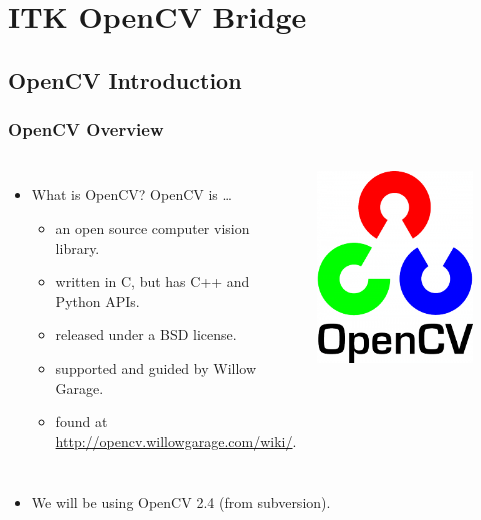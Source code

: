 \section{ITK OpenCV Bridge}

\subsection{OpenCV Introduction}





\begin{frame}
\frametitle{OpenCV Overview}
\begin{center}
\begin{columns}[c]
\begin{itemize}
\item What is OpenCV?  OpenCV is \ldots
  \begin{itemize}
  \item an open source computer vision library.
  \item written in C, but has C++ and Python APIs.
  \item released under a BSD license.
  \item supported and guided by Willow Garage.
  \item found at \url{http://opencv.willowgarage.com/wiki/}.
  \end{itemize}
\end{itemize}
 \includegraphics[width=0.8\textwidth]{../Art/OpenCVLogo.png}
\end{columns}
\pause
\begin{itemize}
\item We will be using OpenCV 2.4 (from subversion).
\end{itemize}
\end{center}
\end{frame}



